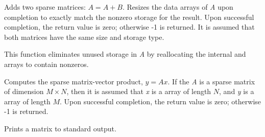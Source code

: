 \documentclass[letterpaper,10pt,english]{sphinxmanual}
\begin{document}

\begin{fulllineitems}
\label{linear_solvers/SLS:c.SlsAddMat}
Adds two sparse matrices: \(A = A+B\).  Resizes the data arrays
of \emph{A} upon completion to exactly match the nonzero storage for
the result.  Upon successful completion, the return value is zero;
otherwise -1 is returned.  It is assumed that both matrices have
the same size and storage type.

\end{fulllineitems}


\begin{fulllineitems}
\label{linear_solvers/SLS:c.ReallocSparseMat}
This function eliminates unused storage in \emph{A} by reallocating
the internal  and  arrays to contain
 nonzeros.

\end{fulllineitems}


\begin{fulllineitems}
\label{linear_solvers/SLS:c.SlsMatvec}
Computes the sparse matrix-vector product, \(y=Ax\).  If the
 \emph{A} is a sparse matrix of dimension \(M\times N\),
then it is assumed that \emph{x} is a  array of  length
\(N\), and \emph{y} is a  array of length
\(M\). Upon successful completion, the return value is zero;
otherwise -1 is returned.

\end{fulllineitems}


\begin{fulllineitems}
\label{linear_solvers/SLS:c.PrintSparseMat}
Prints a {\hyperref[linear_solvers/SLS:c.SlsMat]{\emph{}}} matrix to standard output.

\end{fulllineitems}
\end{document}
